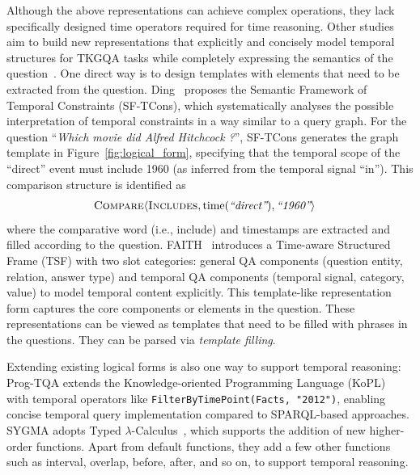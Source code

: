 {%
Although the above representations can achieve complex operations, they lack specifically designed time operators required for time reasoning.
Other studies aim to build new representations that explicitly and concisely model temporal structures for TKGQA tasks while completely expressing the semantics of the question~\cite{chen2024self}. One direct way is to design templates with elements that need to be extracted from the question.
Ding~\cite{dingSemanticFrameworkBased2023} proposes the Semantic Framework of Temporal Constraints (SF-TCons), which systematically analyses the possible interpretation of temporal constraints in a way similar to a query graph. For the question “\textit{Which movie did Alfred Hitchcock   ?}”, SF-TCons generates the graph template in Figure~\ref{fig:logical_form}, specifying that the temporal scope of the “direct” event must include 1960 (as inferred from the temporal signal “in”). This comparison structure is identified as 
    \begin{align*}
\textsc{Compare}&\langle\textsc{Includes},\mathrm{time}(\textit{``direct''}),\textit{``1960''}\rangle
    \end{align*}
where the comparative word (i.e., include) and timestamps are extracted and filled according to the question.
FAITH~\cite{jiaFaithfulTemporalQuestion2024} introduces a Time-aware Structured Frame (TSF) with two slot categories: general QA components (question entity, relation, answer type) and temporal QA components (temporal signal, category, value) to model temporal content explicitly. This template-like representation form captures the core components or elements in the question. 
These representations can be viewed as templates that need to be filled with phrases in the questions. They can be parsed via \textit{template filling}.

Extending existing logical forms is also one way to support temporal reasoning:
Prog-TQA extends the Knowledge-oriented Programming Language (KoPL)~\cite{caoKQAProDataset2022} with temporal operators like \texttt{FilterByTimePoint(Facts, "2012")}, enabling concise temporal query implementation compared to SPARQL-based approaches. SYGMA adopts Typed $\lambda$-Calculus~\cite{zettlemoyer2012learning}, which supports the addition of new higher-order functions. Apart from default functions, they add a few other functions such as interval, overlap, before, after, and so on, to support temporal reasoning. %

}
